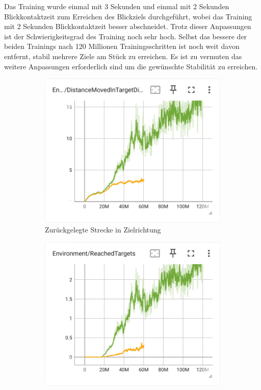 Das Training wurde einmal mit 3 Sekunden und einmal mit 2 Sekunden Blickkontaktzeit zum Erreichen des Blickziels durchgeführt, wobei das Training mit 2 Sekunden Blickkontaktzeit besser abschneidet. Trotz dieser Anpassungen ist der Schwierigkeitsgrad des Training noch sehr hoch. Selbst das bessere der beiden Trainings nach 120 Millionen Trainingsschritten ist noch weit davon entfernt, stabil mehrere Ziele am Stück zu erreichen. Es ist zu vermuten das weitere Anpassungen erforderlich sind um die gewünschte Stabilität zu erreichen.

\begin{figure}[H]
  \centering  
    \begin{subfigure}{.49\textwidth}
      \centering  
      \includegraphics[width=\textwidth]{img/117_119_move_target_dir}
      \caption{Zurückgelegte Strecke in Zielrichtung}
      \label{fig:117_119_move_target_dir}
    \end{subfigure}
    \begin{subfigure}{.49\textwidth}
      \centering  
      \includegraphics[width=\textwidth]{img/117_119_reach_target}

\end{subfigure}
\end{figure}
